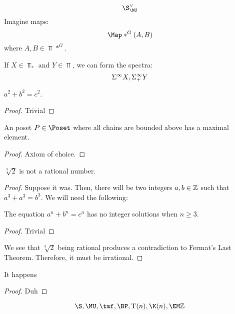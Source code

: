 \documentclass{amsart}
\begin{document}
$$ \S\compl[\MU] $$
Imagine maps:
$$ \Map*^G(A, B) $$
where $ A, B \in \Top*^G $.

If $ X \in \Top_* $ and $ Y \in \Top $, we can form the spectra:
$$ \Suspinf X, \Suspinf+ Y $$

\begin{thm}[Pythagoras]
$ a^2 + b^2 = c^2 $.
\begin{proof}
Trivial
\end{proof}
\end{thm}

\begin{lemma}
An poset $ P \in \Poset $ where all chains are bounded above has a maximal element.
\begin{proof}
Axiom of choice.
\end{proof}
\end{lemma}

\begin{prop}
$ \sqrt[3]{2} $ is not a rational number.
\begin{proof}
Suppose it was.
Then, there will be two integers $ a, b \in \mathbb{Z} $ such that $ a^3 + a^3 = b^3 $.
We will need the following:
\begin{thm}
The equation $ a^n + b^n = c^n $ has no integer solutions when $ n \ge 3 $.
\begin{proof}
Trivial
\end{proof}
\end{thm}
We see that $ \sqrt[3]{2} $ being rational produces a contradiction to Fermat's Last Theorem.
Therefore, it must be irrational.
\end{proof}
\end{prop}

\begin{rmk}
It happens
\begin{proof}
Duh
\end{proof}
\end{rmk}

$$ \S, \MU, \tmf, \BP, \T(n), \K(n), \HZ $$
\end{document}
